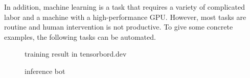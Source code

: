 \documentclass[lettersize,journal]{IEEEtran}
\begin{document}
In addition, machine learning is a task that requires a variety of complicated labor and a machine with a high-performance GPU.
However, most tasks are routine and human intervention is not productive.
To give some concrete examples, the following tasks can be automated.

\begin{figure}[htbp]
    \begin{center}
  \end{center}
  \caption{training result in tensorbord.dev}
  \label{fig:tensorbord}
\end{figure}

\begin{figure}[htbp]
    \begin{center}
  \end{center}
  \caption{inference bot}
  \label{fig:inference_bot}
\end{figure}
\end{document}
